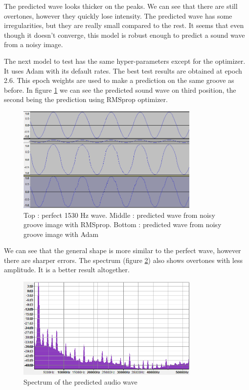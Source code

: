 \documentclass[12pt, twoside]{article}
\begin{document}
The predicted wave looks thicker on the peaks. We can see that there are still overtones, however they quickly lose intensity. The predicted wave has some irregularities, but they are really small compared to the rest. It seems that even though it doesn't converge, this model is robust enough to predict a sound wave from a noisy image.

The next model to test has the same hyper-parameters except for the optimizer. It uses Adam with its default rates. The best test results are obtained at epoch 2.6. This epoch weights are used to make a prediction on the same groove as before. In figure \ref{predm4004} we can see the predicted sound wave on third position, the second being the prediction using RMSprop optimizer.
\begin{figure}
	\centering
	\includegraphics[width=0.8\textwidth]{../images/pred4004.png}
	\caption{Top : perfect 1530 Hz wave. Middle :  predicted wave from noisy groove image with RMSprop. Bottom : predicted wave from noisy groove image with Adam}
	\label{predm4004}
\end{figure}
We can see that the general shape is more similar to the perfect wave, however there are sharper errors. The spectrum (figure \ref{spectrum4004}) also shows overtones with less amplitude. It is a better result altogether.
\begin{figure}
	\centering
	\includegraphics[width=0.8\textwidth]{../images/spectrum_m4004.png}
	\caption{Spectrum of the predicted audio wave}
	\label{spectrum4004}
\end{figure}
\end{document}
